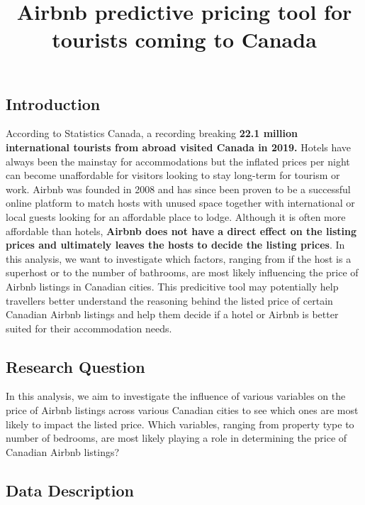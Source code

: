 \documentclass[
]{article}
\title{Airbnb predictive pricing tool for tourists coming to Canada}
\author{}
\date{\vspace{-2.5em}}
\begin{document}
\maketitle

{
\setcounter{tocdepth}{2}
\tableofcontents
}
\hypertarget{introduction}{%
\subsection{Introduction}\label{introduction}}

According to Statistics Canada, a recording breaking \textbf{22.1
million international tourists from abroad visited Canada in 2019.}
Hotels have always been the mainstay for accommodations but the inflated
prices per night can become unaffordable for visitors looking to stay
long-term for tourism or work. Airbnb was founded in 2008 and has since
been proven to be a successful online platform to match hosts with
unused space together with international or local guests looking for an
affordable place to lodge. Although it is often more affordable than
hotels, \textbf{Airbnb does not have a direct effect on the listing
prices and ultimately leaves the hosts to decide the listing prices}. In
this analysis, we want to investigate which factors, ranging from if the
host is a superhost or to the number of bathrooms, are most likely
influencing the price of Airbnb listings in Canadian cities. This
predicitive tool may potentially help travellers better understand the
reasoning behind the listed price of certain Canadian Airbnb listings
and help them decide if a hotel or Airbnb is better suited for their
accommodation needs.

\hypertarget{research-question}{%
\subsection{Research Question}\label{research-question}}

In this analysis, we aim to investigate the influence of various
variables on the price of Airbnb listings across various Canadian cities
to see which ones are most likely to impact the listed price. Which
variables, ranging from property type to number of bedrooms, are most
likely playing a role in determining the price of Canadian Airbnb
listings?

\hypertarget{data-description}{%
\subsection{Data Description}\label{data-description}}
\end{document}
